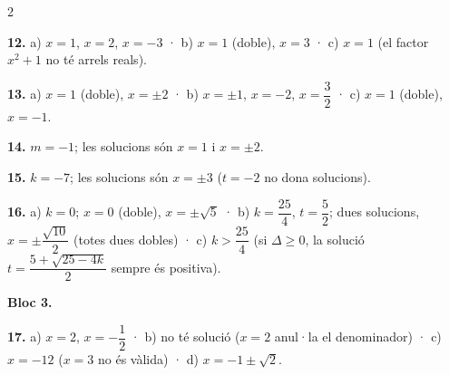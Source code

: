 \documentclass[13pt,a4paper]{extarticle}
\begin{document}
\begin{multicols}{2}
\par\noindent\begin{minipage}{\linewidth}
\textbf{12.} a) $x=1$, $x=2$, $x=-3$ · b) $x=1$ (doble), $x=3$ · c) $x=1$ (el factor $x^2+1$ no té arrels reals).\par
\end{minipage}\par\vspace{1.6mm}
\par\noindent\begin{minipage}{\linewidth}
\textbf{13.} a) $x=1$ (doble), $x=\pm2$ · b) $x=\pm1$, $x=-2$, $x=\dfrac32$ · c) $x=1$ (doble), $x=-1$.\par
\end{minipage}\par\vspace{1.6mm}
\par\noindent\begin{minipage}{\linewidth}
\textbf{14.} $m=-1$; les solucions són $x=1$ i $x=\pm2$.\par
\end{minipage}\par\vspace{1.6mm}
\par\noindent\begin{minipage}{\linewidth}
\textbf{15.} $k=-7$; les solucions són $x=\pm3$ ($t=-2$ no dona solucions).\par
\end{minipage}\par\vspace{1.6mm}
\par\noindent\begin{minipage}{\linewidth}
\textbf{16.} a) $k=0$; $x=0$ (doble), $x=\pm\sqrt5$ · b) $k=\dfrac{25}{4}$, $t=\dfrac52$; dues solucions, $x=\pm\dfrac{\sqrt{10}}{2}$ (totes dues dobles) · c) $k>\dfrac{25}{4}$ (si $\Delta\geq0$, la solució $t=\dfrac{5+\sqrt{25-4k}}{2}$ sempre és positiva).\par
\end{minipage}\par\vspace{1.6mm}
\textbf{Bloc 3.}\par
\par\noindent\begin{minipage}{\linewidth}
\textbf{17.} a) $x=2$, $x=-\dfrac12$ · b) no té solució ($x=2$ anul·la el denominador) · c) $x=-12$ ($x=3$ no és vàlida) · d) $x=-1\pm\sqrt2$.\par
\end{minipage}\par\vspace{1.6mm}

\end{multicols}
\end{document}
